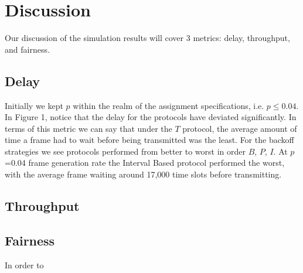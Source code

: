 \documentclass[twocolumn]{article}
\begin{document}
%
%


\section*{Discussion}
Our discussion of the simulation results will cover 3 metrics: delay, throughput, and fairness.

\subsection*{Delay} Initially we kept $p$ within the realm of the assignment specifications,
i.e. $p \leq 0.04$. In Figure 1, notice that the delay for the protocols have deviated
significantly. In terms of this metric we can say that under the $T$ protocol, the average
amount of time a frame had to wait before being transmitted was the least. For the backoff
strategies we see protocols performed from better to worst in order $B$, $P$, $I$. At $p$=0.04
frame generation rate the Interval Based protocol performed the worst, with the average frame
waiting around 17,000 time slots before transmitting.



\subsection*{Throughput}

\subsection*{Fairness} In order to 
\end{document}
